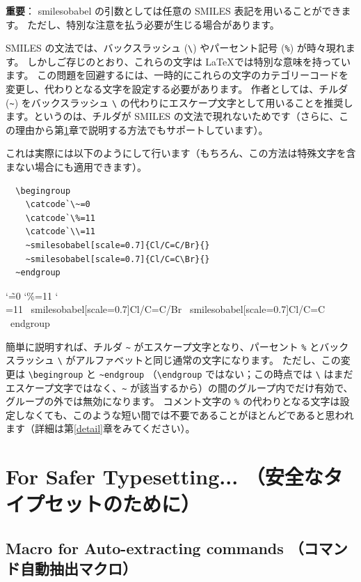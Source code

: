 \documentclass[12pt]{jsarticle}
\begin{document}
\noindent \textbf{重要}：
\textsf{smilesobabel} の引数としては任意の SMILES 表記を用いることができます。
ただし、特別な注意を払う必要が生じる場合があります。

SMILES の文法では、バックスラッシュ (\verb|\|) やパーセント記号 (\verb|%|) が時々現れます。
しかしご存じのとおり、これらの文字は \LaTeX では特別な意味を持っています。
この問題を回避するには、一時的にこれらの文字のカテゴリーコードを変更し、代わりとなる文字を設定する必要があります。
作者としては、チルダ (\verb|~|) をバックスラッシュ \verb|\| の代わりにエスケープ文字として用いることを推奨します。というのは、チルダが SMILES の文法で現れないためです（さらに、この理由から第\ref{extract}章で説明する方法でもサポートしています）。

これは実際には以下のようにして行います（もちろん、この方法は特殊文字を含まない場合にも適用できます）。
\begin{verbatim}
  \begingroup
    \catcode`\~=0
    \catcode`\%=11
    \catcode`\\=11
    ~smilesobabel[scale=0.7]{Cl/C=C/Br}{}
    ~smilesobabel[scale=0.7]{Cl/C=C\Br}{}
  ~endgroup
\end{verbatim}
  \begingroup
    \catcode`\~=0
    \catcode`\%=11
    \catcode`\\=11
    ~smilesobabel[scale=0.7]{Cl/C=C/Br}{}
    ~smilesobabel[scale=0.7]{Cl/C=C\Br}{}
  ~endgroup

簡単に説明すれば、チルダ \verb|~| がエスケープ文字となり、パーセント \verb|%| とバックスラッシュ \verb|\| がアルファベットと同じ通常の文字になります。
ただし、この変更は \verb|\begingroup| と \verb|~endgroup| （\verb|\endgroup| ではない；この時点では \verb|\| はまだエスケープ文字ではなく、\verb|~| が該当するから）の間のグループ内でだけ有効で、グループの外では無効になります。
コメント文字の \verb|%| の代わりとなる文字は設定しなくても、このような短い間では不要であることがほとんどであると思われます（詳細は第\ref{detail}章をみてください）。

\clearpage

\section{For Safer Typesetting... （安全なタイプセットのために）} \label{extract}

\subsection{Macro for Auto-extracting commands （コマンド自動抽出マクロ）}
\end{document}
